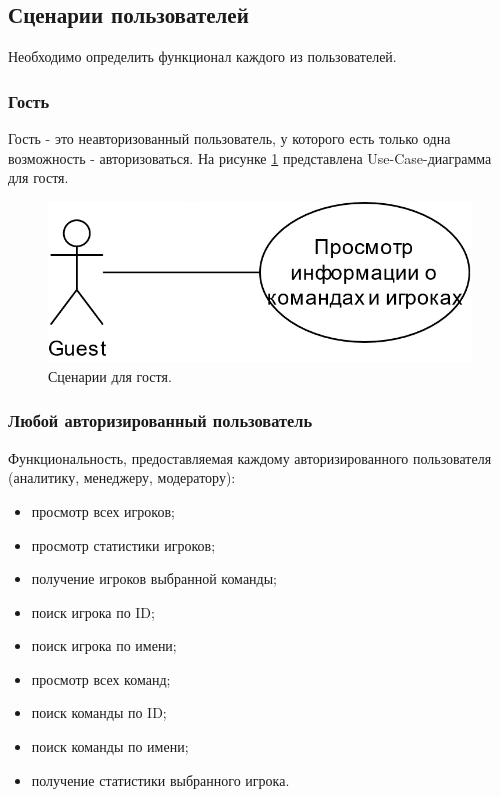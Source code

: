 \subsection{Сценарии пользователей}
Необходимо определить функционал каждого из пользователей. 
\subsubsection{Гость}
Гость - это неавторизованный пользователь, у которого есть только одна возможность - авторизоваться. На рисунке \ref{img:UseCaseGuest} представлена Use-Case-диаграмма для гостя.

\begin{figure}[h!]
	\centering
	\includegraphics[scale=0.35]{img/UseCaseGuest.png}
	\caption{Сценарии для гостя.}
	\label{img:UseCaseGuest}
\end{figure}

\subsubsection{Любой авторизированный пользователь}
Функциональность, предоставляемая каждому авторизированного пользователя (аналитику, менеджеру, модератору):
\begin{itemize}
	\item[1)] просмотр всех игроков;
	\item[2)] просмотр статистики игроков;
	\item[3)] получение игроков выбранной команды;
	\item[4)] поиск игрока по ID;
	\item[5)] поиск игрока по имени;
	\item[6)] просмотр всех команд;
	\item[7)] поиск команды по ID;
	\item[8)] поиск команды по имени;
	\item[9)] получение статистики выбранного игрока.      
\end{itemize}

